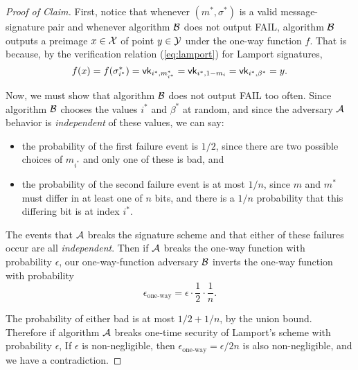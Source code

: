 \begin{proof}[Proof of Claim]
First, notice that whenever $(m^*, \sigma^*)$ is a valid message-signature
pair and whenever algorithm $\mathcal{B}$ does not output FAIL, algorithm $\mathcal{B}$
outputs a preimage $x \in \mathcal{X}$ of point $y \in \mathcal{Y}$ under the one-way function $f$.
That is because, by the verification relation (\ref{eq:lamport}) for Lamport signatures,
\[f(x) = f(\sigma^*_{i^*}) = \mathsf{vk}_{i^*,m^*_{i^*}} = \mathsf{vk}_{i^*, 1 - m_i} = \mathsf{vk}_{i^*, \beta^*} = y.\]

Now, we must show that algorithm $\mathcal{B}$ does not output FAIL too often.
Since algorithm $\mathcal{B}$ chooses the values $i^*$ and $\beta^*$ at random,
and since the adversary $\mathcal{A}$ behavior is \emph{independent} of these values,
we can say:
  \begin{itemize}
    \item the probability of the first failure event is $1/2$,
          since there are two possible choices of $m_{i^*}$ and only 
          one of these is bad, and 
    \item the probability of the second failure event is at most $1/n$,
          since $m$ and $m^*$ must differ in at least one of $n$ bits,
          and there is a $1/n$ probability that this differing bit is
          at index $i^*$.
  \end{itemize}

The events that $\mathcal{A}$ breaks the signature scheme
and that either of these failures occur are all \emph{independent}.
Then if $\mathcal{A}$ breaks the one-way function with probability $\epsilon$,
our one-way-function adversary $\mathcal{B}$
inverts the one-way function with probability
\[ \epsilon_\text{one-way} = \epsilon \cdot \frac{1}{2} \cdot \frac{1}{n}.\]

The probability of either bad is at most $1/2 + 1/n$,
by the union bound.
Therefore if algorithm $\mathcal{A}$ breaks one-time security of Lamport's
scheme with probability $\epsilon$,
If $\epsilon$ is non-negligible, then $\epsilon_\text{one-way} = \epsilon/2n$
is also non-negligible, and we have a contradiction.
\end{proof}
